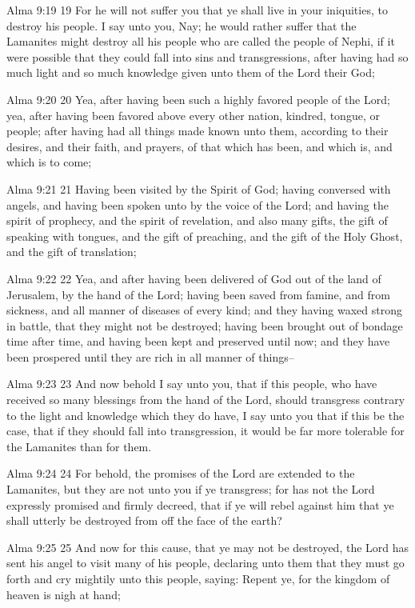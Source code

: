 Alma 9:19
 19 For he will not suffer you that ye shall live in your
iniquities, to destroy his people. I say unto you, Nay; he would
rather suffer that the Lamanites might destroy all his people who
are called the people of Nephi, if it were possible that they
could fall into sins and transgressions, after having had so much
light and so much knowledge given unto them of the Lord their
God;

Alma 9:20
 20 Yea, after having been such a highly favored people of the
Lord; yea, after having been favored above every other nation,
kindred, tongue, or people; after having had all things made
known unto them, according to their desires, and their faith, and
prayers, of that which has been, and which is, and which is to
come;

Alma 9:21
 21 Having been visited by the Spirit of God; having conversed
with angels, and having been spoken unto by the voice of the
Lord; and having the spirit of prophecy, and the spirit of
revelation, and also many gifts, the gift of speaking with
tongues, and the gift of preaching, and the gift of the Holy
Ghost, and the gift of translation;

Alma 9:22
 22 Yea, and after having been delivered of God out of the land
of Jerusalem, by the hand of the Lord; having been saved from
famine, and from sickness, and all manner of diseases of every
kind; and they having waxed strong in battle, that they might not
be destroyed; having been brought out of bondage time after time,
and having been kept and preserved until now; and they have been
prospered until they are rich in all manner of things--

Alma 9:23
 23 And now behold I say unto you, that if this people, who have
received so many blessings from the hand of the Lord, should
transgress contrary to the light and knowledge which they do
have, I say unto you that if this be the case, that if they
should fall into transgression, it would be far more tolerable
for the Lamanites than for them.

Alma 9:24
 24 For behold, the promises of the Lord are extended to the
Lamanites, but they are not unto you if ye transgress; for has
not the Lord expressly promised and firmly decreed, that if ye
will rebel against him that ye shall utterly be destroyed from
off the face of the earth?

Alma 9:25
 25 And now for this cause, that ye may not be destroyed, the
Lord has sent his angel to visit many of his people, declaring
unto them that they must go forth and cry mightily unto this
people, saying: Repent ye, for the kingdom of heaven is nigh at
hand;

